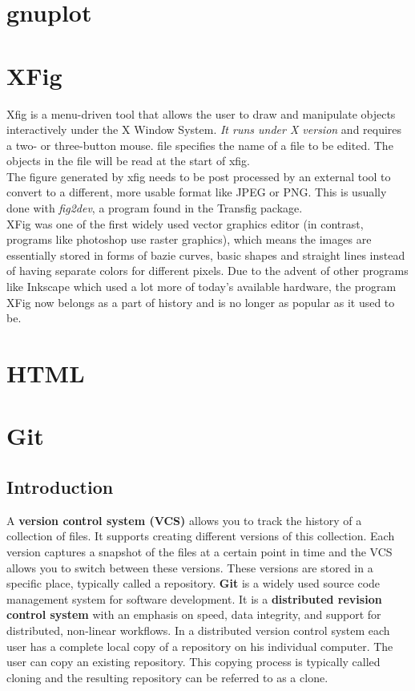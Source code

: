 \documentclass{article}
\begin{document}
\section{gnuplot}
\section{XFig}
Xfig  is a menu-driven tool that allows the user to draw and manipulate
objects interactively under the X Window System.  \emph{ It runs under X
version  } and requires a two- or three-button mouse.
file specifies the name of a file to be edited.   The  objects  in  the
file will be read at the start of xfig.
\\
The figure generated by xfig needs to be post processed by an external tool
to convert to a different, more usable format like JPEG or PNG. This is
usually done with \emph{fig2dev}, a program found in the Transfig package.
\\
XFig was one of the first widely used vector graphics editor (in contrast,
programs like photoshop use raster graphics), which means the images are
essentially stored in forms of bazie curves, basic shapes and straight lines
instead of having separate colors for different pixels. Due to the advent
of other programs like Inkscape which used a lot more of today's available
hardware, the program XFig now belongs as a part of history and is no longer
as popular as it used to be.
\section{HTML}
\section{Git}
	\subsection{Introduction}
	A \textbf{version control system (VCS)} allows you to track the history of a collection of files. It supports creating different versions of this collection. Each version captures a snapshot of the files at a certain point in time and the VCS allows you to switch between these versions. These versions are stored in a specific place, typically called a repository.
	\textbf{Git} is a widely used source code management system for software development. It is a \textbf{distributed revision control system} with an emphasis on speed, data integrity, and support for distributed, non-linear workflows. In a distributed version control system each user has a complete local copy of a repository on his individual computer. The user can copy an existing repository. This copying process is typically called cloning and the resulting repository can be referred to as a clone.
	
\end{document}
